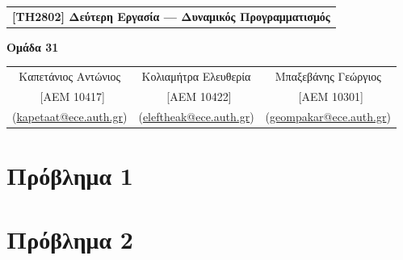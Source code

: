 \newcommand{\reporttitle}{Δεύτερη Εργασία --- Δυναμικός Προγραμματισμός}
\newcommand{\reportauthorOne}{Καπετάνιος Αντώνιος}
\newcommand{\cidOne}{10417}
\newcommand{\reportauthorTwo}{Κολιαμήτρα Ελευθερία}
\newcommand{\cidTwo}{10422}
\newcommand{\reportauthorThree}{Μπαξεβάνης Γεώργιος}
\newcommand{\cidThree}{10301}


\setcounter{secnumdepth}{-1}



	\begin{center}
		\begin{table}[H]
			\begin{center}
				\begin{tabular}{c}
					\textbf{[ΤΗ2802] \reporttitle}\\
				\end{tabular}
			\end{center}
		\end{table}
		\vspace*{-4pt}
		\textbf{Ομάδα 31}
		\vspace*{-8pt}
		\begin{table}[H]
			\begin{center}
				\begin{tabular}{ccc}
					\reportauthorOne&\reportauthorTwo&\reportauthorThree\\
					\small{~[ΑΕΜ \cidOne]}&\small{~[ΑΕΜ \cidTwo]}&\small{~[ΑΕΜ \cidThree]}\\
					\small{(\url{kapetaat@ece.auth.gr})}&\small{(\url{eleftheak@ece.auth.gr})}&\small{(\url{geompakar@ece.auth.gr})}
				\end{tabular}
			\end{center}
		\end{table}
	\end{center}

	\setlength{\columnsep}{32pt}
	\setlength{\columnseprule}{0.5pt}
	\begin{multicols*}{2}
		\section{Πρόβλημα 1}
		
		\section{Πρόβλημα 2}
		
		\printbibliography
	\end{multicols*}

